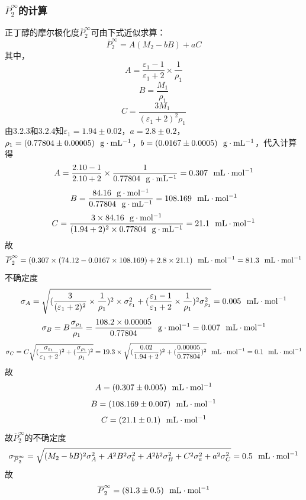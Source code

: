 \documentclass[12pt]{article}
\begin{document}
\subsubsection{$\overline{P}^{\infty}_{2}$的计算}
正丁醇的摩尔极化度$\overline{P}^{\infty}_{2}$可由下式近似求算：
$$
\overline{P}^{\infty}_{2}=A(M_{2}-bB)+aC
$$
其中，
$$
A=\frac{\varepsilon_{1}-1}{\varepsilon_{1}+2}\times \frac{1}{\rho_{1}}
$$
$$
B=\frac{M_{1}}{\rho_{1}}
$$
$$
C=\frac{3M_{1}}{(\varepsilon_{1}+2)^{2}\rho_{1}}
$$
由3.2.3和3.2.4知$\varepsilon_{1}=1.94\pm 0.02$，$a=2.8\pm 0.2$，$\rho_{1}=(0.77804\pm 0.00005)\ \ {\rm g\cdot mL^{-1}}$，$b=(0.0167\pm 0.0005)\ \ {\rm g\cdot mL^{-1}}$，代入计算得
$$
A=\frac{2.10-1}{2.10+2}\times \frac{1}{0.77804\ \ {\rm g\cdot mL^{-1}}}=0.307\ \ {\rm mL\cdot mol^{-1}}
$$
$$
B=\frac{84.16\ \ {\rm g\cdot mol^{-1}}}{0.77804\ \ {\rm g\cdot mL^{-1}}}=108.169\ \ {\rm mL\cdot mol^{-1}}
$$
$$
C=\frac{3\times 84.16\ \ {\rm g\cdot mol^{-1}}}{(1.94+2)^{2}\times 0.77804\ \ {\rm g\cdot mL^{-1}}}=21.1\ \ {\rm mL\cdot mol^{-1}}
$$
故
$$
\overline{P}^{\infty}_{2}=(0.307 \times (74.12 -0.0167 \times 108.169)+2.8 \times 21.1)\ \ {\rm mL\cdot mol^{-1}} = 81.3 \ \ {\rm mL\cdot mol^{-1}} 
$$
不确定度
$$
\sigma_{A}=\sqrt{( \frac{3}{(\varepsilon_{1}+2)^{2}} \times  \frac{1}{\rho_{1}})^{2}\times \sigma^{2}_{\varepsilon_{1}}+(\frac{\varepsilon_{1}-1}{\varepsilon_{1}+2}\times \frac{1}{\rho_{1}})^{2}\sigma^{2}_{\rho_{1}}}=0.005\ \ {\rm mL\cdot mol^{-1}}
$$
$$
\sigma_{B}=B\frac{\sigma_{\rho_{1}}}{\rho_{1}}=\frac{108.2\times 0.00005}{0.77804}\ \ {\rm g\cdot mol^{-1}}=0.007\ \ {\rm  mL\cdot mol^{-1}}
$$
$$
\sigma_{C}=C\sqrt{(\frac{\sigma_{\varepsilon_{1}}}{\varepsilon_{1}+2})^{2}+(\frac{\sigma_{\rho_{1}}}{\rho_{1}})^{2}}=19.3\times \sqrt{(\frac{0.02}{1.94+2})^{2}+(\frac{0.00005}{0.77804})^{2}} \ \ {\rm mL\cdot mol^{-1}}=0.1\ \ {\rm mL\cdot mol^{-1}}
$$
故
$$
A=(0.307\pm 0.005)\ \ {\rm mL\cdot mol^{-1}}
$$
$$
B=(108.169\pm 0.007)\ \ {\rm mL\cdot mol^{-1}}
$$
$$
C=(21.1\pm 0.1)\ \ {\rm mL\cdot mol^{-1}}
$$
故$\overline{P}^{\infty}_{2}$的不确定度
$$
\sigma_{\overline{P}^{\infty}_{2}}=\sqrt{(M_{2}-bB)^{2} \sigma_{A}^{2}+A^{2} B^{2} \sigma_{b}^{2}+A^{2} b^{2} \sigma_{B}^{2}+C^{2} \sigma_{a}^{2}+a^{2} \sigma_{C}^{2}}=0.5\ \ {\rm mL\cdot mol^{-1}}
$$
故
$$
\overline{P}^{\infty}_{2}=(81.3\pm 0.5)\ \ {\rm mL\cdot mol^{-1}}
$$
\end{document}
